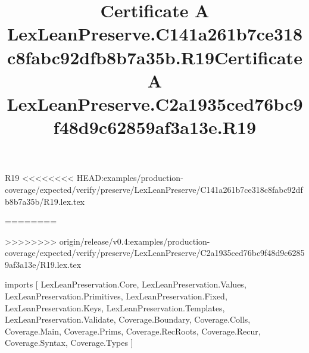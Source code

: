 \begin{lexlean}{R19}
<<<<<<<< HEAD:examples/production-coverage/expected/verify/preserve/LexLeanPreserve/C141a261b7ce318c8fabc92dfb8b7a35b/R19.lex.tex
\title{Certificate A LexLeanPreserve.C141a261b7ce318c8fabc92dfb8b7a35b.R19}
========
\title{Certificate A LexLeanPreserve.C2a1935ced76bc9f48d9c62859af3a13e.R19}
>>>>>>>> origin/release/v0.4:examples/production-coverage/expected/verify/preserve/LexLeanPreserve/C2a1935ced76bc9f48d9c62859af3a13e/R19.lex.tex
\begin{coremodule}
imports [
  LexLeanPreservation.Core,
  LexLeanPreservation.Values,
  LexLeanPreservation.Primitives,
  LexLeanPreservation.Fixed,
  LexLeanPreservation.Keys,
  LexLeanPreservation.Templates,
  LexLeanPreservation.Validate,
  Coverage.Boundary,
  Coverage.Colls,
  Coverage.Main,
  Coverage.Prims,
  Coverage.RecRoots,
  Coverage.Recur,
  Coverage.Syntax,
  Coverage.Types
]


\end{coremodule}
\end{lexlean}
